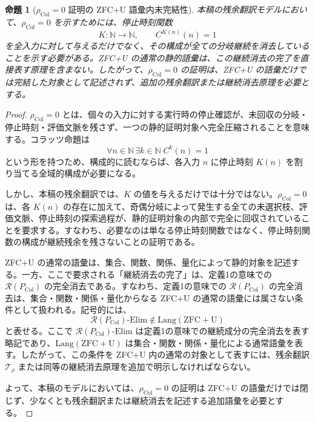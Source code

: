 \documentclass[11pt,a4paper,ja=standard,autodetect-engine]{bxjsarticle}
\newtheorem{proposition}{命題}
\begin{document}
\begin{proposition}[$\rho_{\mathrm{Col}}=0$ 証明の ZFC+U 語彙内未完結性]
本稿の残余翻訳モデルにおいて、$\rho_{\mathrm{Col}}=0$ を示すためには、停止時刻関数
\begin{equation}
    K:\mathbb{N}\to\mathbb{N},\qquad C^{K(n)}(n)=1
\end{equation}
を全入力に対して与えるだけでなく、その構成が全ての分岐継続を消去していることを示す必要がある。ZFC+U の通常の静的語彙は、この継続消去の完了を直接表す原理を含まない。したがって、$\rho_{\mathrm{Col}}=0$ の証明は、ZFC+U の語彙だけでは完結した対象として記述されず、追加の残余翻訳または継続消去原理を必要とする。
\end{proposition}

\begin{proof}
$\rho_{\mathrm{Col}}=0$ とは、個々の入力に対する実行時の停止確認が、未回収の分岐・停止時刻・評価文脈を残さず、一つの静的証明対象へ完全圧縮されることを意味する。コラッツ命題は
\begin{equation}
    \forall n\in\mathbb{N}\,\exists k\in\mathbb{N}\; C^{k}(n)=1
\end{equation}
という形を持つため、構成的に読むならば、各入力 $n$ に停止時刻 $K(n)$ を割り当てる全域的構成が必要になる。

しかし、本稿の残余翻訳では、$K$ の値を与えるだけでは十分ではない。$\rho_{\mathrm{Col}}=0$ は、各 $K(n)$ の存在に加えて、奇偶分岐によって発生する全ての未選択枝、評価文脈、停止時刻の探索過程が、静的証明対象の内部で完全に回収されていることを要求する。すなわち、必要なのは単なる停止時刻関数ではなく、停止時刻関数の構成が継続残余を残さないことの証明である。

ZFC+U の通常の語彙は、集合、関数、関係、量化によって静的対象を記述する。一方、ここで要求される「継続消去の完了」は、定義1の意味での $\mathcal{R}(P_{\mathrm{Col}})$ の完全消去である。すなわち、定義1の意味での $\mathcal{R}(P_{\mathrm{Col}})$ の完全消去は、集合・関数・関係・量化からなる ZFC+U の通常の語彙には属さない条件として扱われる。記号的には、
\begin{equation}
    \mathcal{R}(P_{\mathrm{Col}})\text{-Elim}
    \notin
    \mathrm{Lang}(\mathrm{ZFC+U})
\end{equation}
と表せる。ここで $\mathcal{R}(P_{\mathrm{Col}})\text{-Elim}$ は定義1の意味での継続成分の完全消去を表す略記であり、$\mathrm{Lang}(\mathrm{ZFC+U})$ は集合・関数・関係・量化による通常語彙を表す。したがって、この条件を ZFC+U 内の通常の対象として表すには、残余翻訳 $\mathcal{T}_{\rho}$ または同等の継続消去原理を追加で明示しなければならない。

よって、本稿のモデルにおいては、$\rho_{\mathrm{Col}}=0$ の証明は ZFC+U の語彙だけでは閉じず、少なくとも残余翻訳または継続消去を記述する追加語彙を必要とする。
\end{proof}
\end{document}
